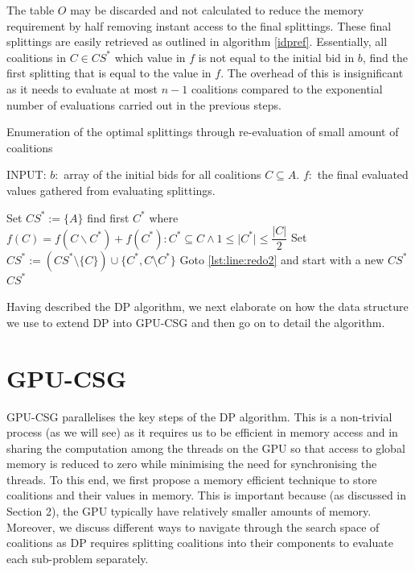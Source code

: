 \documentclass{llncs}
\begin{document}
The table $O$ may be discarded and not calculated to reduce the memory requirement by half removing instant access to the final splittings. These final splittings are easily retrieved as outlined in algorithm \ref{idpref}.  Essentially, all coalitions in $C \in CS^*$ which value in $f$ is not equal to the initial bid in $b$, find the first splitting that is equal to the value in $f$. The overhead of this is insignificant as it needs to evaluate at most $n -1$ coalitions compared to the exponential
number of evaluations carried out in the previous steps\cite{eps265062}.

\begin{algorithm}
\caption{Enumeration of the optimal splittings through re-evaluation of small amount of coalitions \label{idpref}}
INPUT: $b:$ array of the initial bids for all coalitions $C \subseteq A$. 
$f:$ the final evaluated values gathered from evaluating splittings.
\begin{algorithmic}[1]
\STATE Set $CS^* := \{A\}$
 \label{lst:line:redo2}
\STATE find first $C^*$ where $f(C) = f(C\backslash C^*)+f(C^*):C^*\subseteq C \wedge 1 \leq \vert C^* \vert \leq \dfrac{\vert C \vert}{2}$ \label{lst:line:aa}
\STATE Set $CS^* := (CS^*\setminus \{C\})\cup \{C^*,C\setminus C^*\}$
\STATE Goto \ref{lst:line:redo2} and start with a new $CS^*$
\ENDIF
\ENDFOR
\RETURN $CS^*$
\end{algorithmic}
\end{algorithm}
Having described the DP algorithm, we next elaborate on how the data structure we use to extend DP into GPU-CSG and then go on to detail the algorithm.

\section{GPU-CSG} \label{sec:gpu-csg} %
GPU-CSG parallelises the key steps of the DP algorithm. This is a non-trivial process (as we will see) as it requires us to be efficient in memory access and in sharing the computation among the threads on the GPU so that access to global memory is reduced to zero while minimising the need for synchronising the threads. To this end, we first propose a memory efficient technique to store coalitions and their values in memory. This is important because (as discussed  in Section 2), the GPU typically have relatively smaller amounts of memory. Moreover, we discuss different ways to navigate through the search space of coalitions as DP requires splitting coalitions into their components to evaluate each sub-problem separately.
\end{document}
